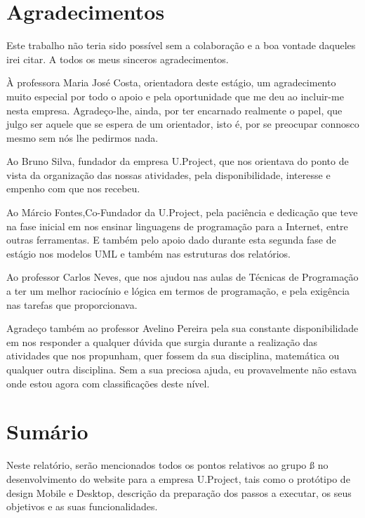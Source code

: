 \documentclass[11pt]{report}
\begin{document}
\newpage



\chapter*{Agradecimentos}
Este trabalho não teria sido possível sem a colaboração e a boa vontade daqueles irei citar. A todos os meus sinceros agradecimentos. 

À professora Maria José Costa, orientadora deste estágio, um agradecimento muito especial por todo o apoio e pela oportunidade que me deu ao incluir-me nesta empresa. Agradeço-lhe, ainda, por ter encarnado realmente o papel, que julgo ser aquele que se espera de um orientador, isto é, por se preocupar connosco mesmo sem nós lhe pedirmos nada.

Ao Bruno Silva, fundador da empresa U.Project, que nos orientava do ponto de vista da organização das nossas atividades, pela disponibilidade, interesse e empenho com que nos recebeu.

 Ao Márcio Fontes,Co-Fundador da U.Project, pela paciência e dedicação que teve na fase inicial em nos ensinar linguagens de programação para a Internet, entre outras ferramentas. E também pelo apoio dado durante esta segunda fase de estágio nos modelos UML e também nas estruturas dos relatórios.
 
Ao professor Carlos Neves, que nos ajudou nas aulas de Técnicas de Programação a ter um melhor raciocínio e lógica em termos de programação, e pela exigência nas tarefas que proporcionava.

Agradeço também ao professor Avelino Pereira pela sua constante disponibilidade em nos responder a qualquer dúvida que surgia durante a realização das atividades que nos propunham, quer fossem da sua disciplina, matemática ou qualquer outra disciplina. Sem a sua preciosa ajuda, eu provavelmente não estava onde estou agora com classificações deste nível.

\newpage

\chapter*{Sumário}
Neste relatório, serão mencionados todos os pontos relativos ao grupo ß no desenvolvimento do website para a empresa U.Project, tais como o protótipo de design Mobile e Desktop, descrição da preparação dos passos a executar, os seus objetivos e as suas funcionalidades.
 
\end{document}
